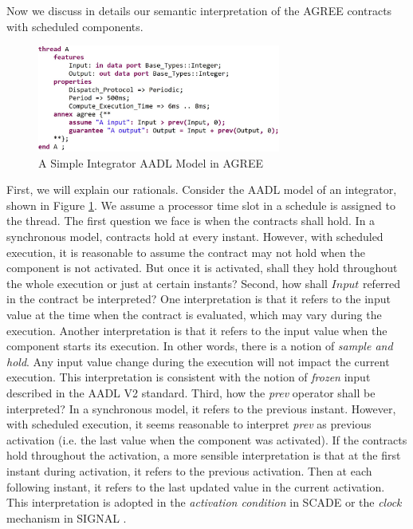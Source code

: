 Now we discuss in details our semantic interpretation of the AGREE contracts with scheduled components.
\begin{figure}[ht!]
\centering
\includegraphics[width=80mm]{pre.jpg}
\caption{A Simple Integrator AADL Model in AGREE\label{integratorFig}}
\end{figure}

First, we will explain our rationals. Consider the AADL model of an integrator, shown in Figure \ref{integratorFig}. We assume a processor time slot in a schedule is assigned to the thread.  
The first question we face is when the contracts shall hold. In a synchronous model, contracts hold at every instant. However, with scheduled execution, it is reasonable to assume the contract may not hold when the component is not activated. But once it is activated, shall they hold throughout the whole execution or just at certain instants? Second, how shall $Input$ referred in the contract be interpreted? One interpretation is that it refers to the input value at the time when the contract is evaluated, which may vary during the execution. Another interpretation is that it refers to the input value when the component starts its execution. In other words, there is a notion of \emph{sample and hold}. Any input value change during the execution will not impact the current execution. This interpretation is consistent with the notion of \emph{frozen} input described in the AADL V2 standard. Third, how the \emph{prev} operator shall be interpreted? In a synchronous model, it refers to the previous instant. However, with scheduled execution, it seems reasonable to interpret \emph{prev} as previous activation (i.e. the last value when the component was activated). If the contracts hold throughout the activation, a more sensible interpretation is that at the first instant during activation, it refers to the previous activation. Then at each following instant, it refers to the last updated value in the current activation. This interpretation is adopted in the \emph{activation condition} in SCADE \cite{scade} or the \emph{clock} mechanism in SIGNAL \cite{signal}.

